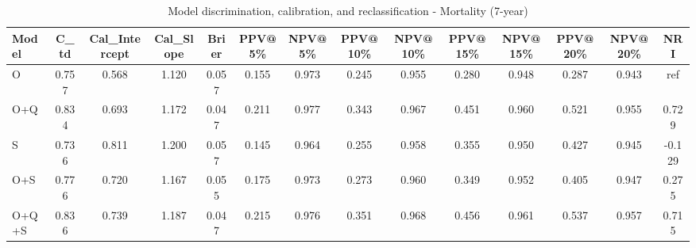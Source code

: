 \begin{table}[htbp]
\centering
\small
\caption{Model discrimination, calibration, and reclassification - Mortality (7-year)}
\label{tab:perf_mortality_7y}
\begin{tabular}{lccccccccccccc}
\toprule
Model & C\_td & Cal\_Intercept & Cal\_Slope & Brier & PPV@5\% & NPV@5\% & PPV@10\% & NPV@10\% & PPV@15\% & NPV@15\% & PPV@20\% & NPV@20\% & NRI \\
\midrule
O & 0.757 & 0.568 & 1.120 & 0.057 & 0.155 & 0.973 & 0.245 & 0.955 & 0.280 & 0.948 & 0.287 & 0.943 & ref \\
O+Q & 0.834 & 0.693 & 1.172 & 0.047 & 0.211 & 0.977 & 0.343 & 0.967 & 0.451 & 0.960 & 0.521 & 0.955 & 0.729 \\
S & 0.736 & 0.811 & 1.200 & 0.057 & 0.145 & 0.964 & 0.255 & 0.958 & 0.355 & 0.950 & 0.427 & 0.945 & -0.129 \\
O+S & 0.776 & 0.720 & 1.167 & 0.055 & 0.175 & 0.973 & 0.273 & 0.960 & 0.349 & 0.952 & 0.405 & 0.947 & 0.275 \\
O+Q+S & 0.836 & 0.739 & 1.187 & 0.047 & 0.215 & 0.976 & 0.351 & 0.968 & 0.456 & 0.961 & 0.537 & 0.957 & 0.715 \\
\bottomrule
\end{tabular}
\end{table}